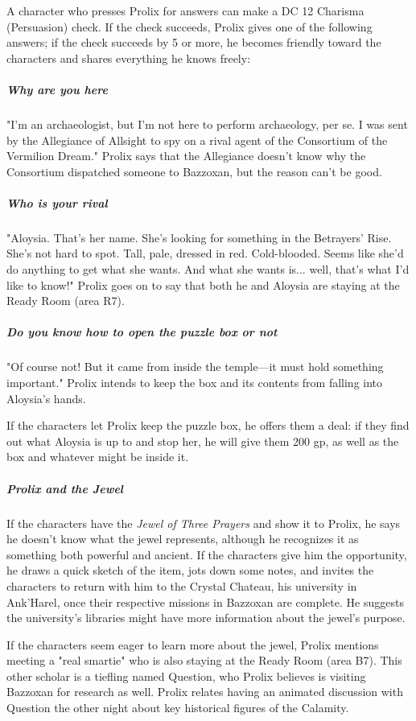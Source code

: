 \documentclass[10pt,a4paper,twoside,fancy,bg=print,twocolumn,openany,nodeprecatedcode]{dndbook}
\begin{document}
A character who presses Prolix for answers can make a DC 12 Charisma (Persuasion) check. If the check succeeds, Prolix gives one of the following answers; if the check succeeds by 5 or more, he becomes friendly toward the characters and shares everything he knows freely:

\subparagraph{Why are you here}
"I'm an archaeologist, but I'm not here to perform archaeology, per se. I was sent by the Allegiance of Allsight to spy on a rival agent of the Consortium of the Vermilion Dream." Prolix says that the Allegiance doesn't know why the Consortium dispatched someone to Bazzoxan, but the reason can't be good.

\subparagraph{Who is your rival}
"Aloysia. That's her name. She's looking for something in the Betrayers' Rise. She's not hard to spot. Tall, pale, dressed in red. Cold-blooded. Seems like she'd do anything to get what she wants. And what she wants is... well, that's what I'd like to know!" Prolix goes on to say that both he and Aloysia are staying at the Ready Room (area R7).

\subparagraph{Do you know how to open the puzzle box or not}
"Of course not! But it came from inside the temple—it must hold something important." Prolix intends to keep the box and its contents from falling into Aloysia's hands.

If the characters let Prolix keep the puzzle box, he offers them a deal: if they find out what Aloysia is up to and stop her, he will give them 200 gp, as well as the box and whatever might be inside it.

\subparagraph{Prolix and the Jewel}
If the characters have the \textit{Jewel of Three Prayers} and show it to Prolix, he says he doesn't know what the jewel represents, although he recognizes it as something both powerful and ancient. If the characters give him the opportunity, he draws a quick sketch of the item, jots down some notes, and invites the characters to return with him to the Crystal Chateau, his university in Ank'Harel, once their respective missions in Bazzoxan are complete. He suggests the university's libraries might have more information about the jewel's purpose.

If the characters seem eager to learn more about the jewel, Prolix mentions meeting a "real smartie" who is also staying at the Ready Room (area B7). This other scholar is a tiefling named Question, who Prolix believes is visiting Bazzoxan for research as well. Prolix relates having an animated discussion with Question the other night about key historical figures of the Calamity.
\end{document}
